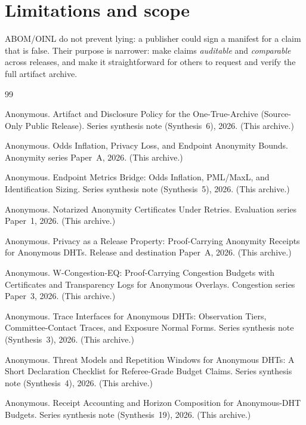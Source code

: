 \documentclass[11pt]{article}
\begin{document}
\section{Limitations and scope}
ABOM/OINL do not prevent lying: a publisher could sign a manifest for a claim that is false.
Their purpose is narrower: make claims \emph{auditable} and \emph{comparable} across releases, and make it straightforward for others to request and verify the full artifact archive.

\begin{thebibliography}{99}\small

Anonymous.
\newblock Artifact and Disclosure Policy for the One-True-Archive (Source-Only Public Release).
\newblock Series synthesis note (Synthesis~6), 2026. (This archive.)

Anonymous.
\newblock Odds Inflation, Privacy Loss, and Endpoint Anonymity Bounds.
\newblock Anonymity series Paper~A, 2026. (This archive.)

Anonymous.
\newblock Endpoint Metrics Bridge: Odds Inflation, PML/MaxL, and Identification Sizing.
\newblock Series synthesis note (Synthesis~5), 2026. (This archive.)

Anonymous.
\newblock Notarized Anonymity Certificates Under Retries.
\newblock Evaluation series Paper~1, 2026. (This archive.)

Anonymous.
\newblock Privacy as a Release Property: Proof-Carrying Anonymity Receipts for Anonymous DHTs.
\newblock Release and destination Paper~A, 2026. (This archive.)

Anonymous.
\newblock W-Congestion-EQ: Proof-Carrying Congestion Budgets with Certificates and Transparency Logs for Anonymous Overlays.
\newblock Congestion series Paper~3, 2026. (This archive.)

Anonymous.
\newblock Trace Interfaces for Anonymous DHTs: Observation Tiers, Committee-Contact Traces, and Exposure Normal Forms.
\newblock Series synthesis note (Synthesis~3), 2026. (This archive.)

Anonymous.
\newblock Threat Models and Repetition Windows for Anonymous DHTs: A Short Declaration Checklist for Referee-Grade Budget Claims.
\newblock Series synthesis note (Synthesis~4), 2026. (This archive.)

Anonymous.
\newblock Receipt Accounting and Horizon Composition for Anonymous-DHT Budgets.
\newblock Series synthesis note (Synthesis~19), 2026. (This archive.)


\end{thebibliography}
\end{document}
